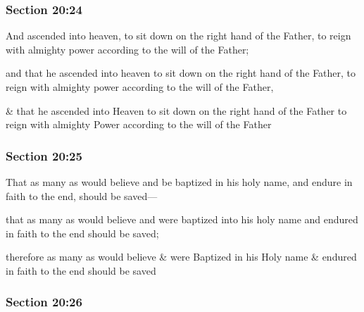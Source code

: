 	\subsubsection{Section 20:24} %
		\label{DC20-24}

		And ascended into heaven, to sit down on the right hand of the Father, to reign with almighty power according to the will of the Father;

		\begin{framed}
		\scriptsize
			\begin{compactdesc}
				\item[JSP] and that he ascended into heaven to sit down on the right hand of the Father, to reign with almighty power according to the will of the Father,
				\item[RB1] \& that he ascended into Heaven to sit down on the right hand of the Father to reign with almighty Power according to the will of the Father
			\end{compactdesc}
		\end{framed}

	\subsubsection{Section 20:25} %
		\label{DC20-25}

		That as many as would believe and be baptized in his holy name, and endure in faith to the end, should be saved---

		\begin{framed}
		\scriptsize
			\begin{compactdesc}
				\item[JSP] that as many as would believe and were baptized into his holy name and endured in faith to the end should be saved;
				\item[RB1] therefore as many as would believe \& were Baptized in his Holy name \& endured in faith to the end should be saved
			\end{compactdesc}
		\end{framed}

	\subsubsection{Section 20:26} %
		\label{DC20-26}

